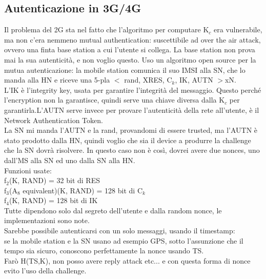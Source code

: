 \documentclass[16px]{article}
\begin{document}
\subsection{Autenticazione in 3G/4G}
Il problema del 2G sta nel fatto che l'algoritmo per computare K$_{c}$ era vulnerabile, ma non c'era nemmeno mutual authentication: suscettibile ad over the air attack, ovvero una finta base station a cui l'utente si collega. La base station non prova mai la sua autenticità, e non voglio questo. Uso un algoritmo open source per la mutua autenticazione:
la mobile station comunica il suo IMSI alla SN, che lo manda alla HN e riceve una 5-pla $<$ rand, XRES, C$_{k}$, IK, AUTN $>$xN.\\ L'IK è l'integrity key, usata per garantire l'integrità del messaggio. Questo perché l'encryption non la garantisce, quindi serve una chiave diversa dalla K$_{c}$ per garantirla.L'AUTN serve invece per provare l'autenticità della rete all'utente, è il Network Authentication Token.\\ La SN mi manda l'AUTN e la rand, provandomi di essere trusted, ma l'AUTN è stato prodotto dalla HN, quindi voglio che sia il device a produrre la challenge che la SN dovrà risolvere. In questo caso non è così, dovrei avere due nonces, uno dall'MS alla SN ed uno dalla SN alla HN.\\ Funzioni usate:\\
f$_{2}$(K, RAND) = 32 bit di RES\\
f$_{3}$(A$_{8}$ equivalent)(K, RAND) = 128 bit di C$_{k}$\\
f$_{4}$(K, RAND) = 128 bit di IK\\
Tutte dipendono solo dal segreto dell'utente e dalla random nonce, le implementazioni sono note.\\ Sarebbe possibile autenticarsi con un solo messaggi, usando il timestamp:\\
se la mobile station e la SN usano ad esempio GPS, sotto l'assunzione che il tempo sia sicuro, conoscono perfettamente la nonce usando TS.\\ Farò H(TS,K), non posso avere reply attack etc... e con questa forma di nonce evito l'uso della challenge.
\end{document}
